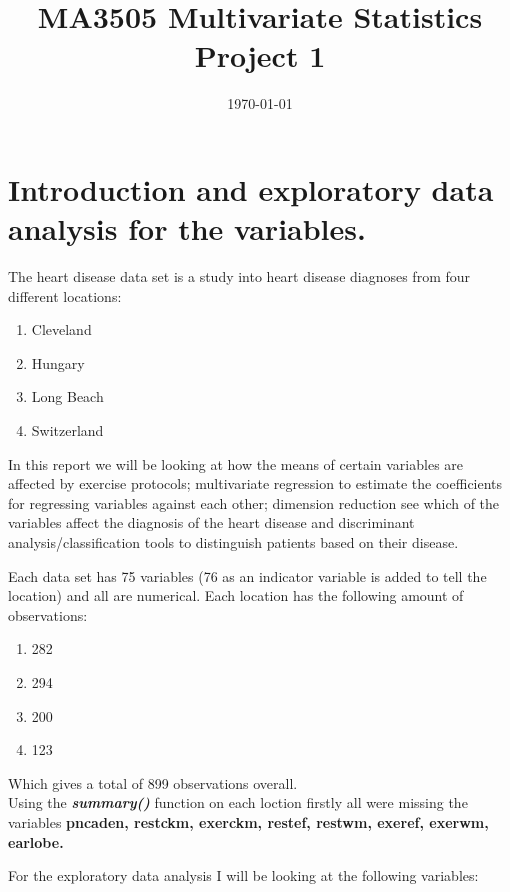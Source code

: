 \documentclass[a4paper]{article}
\title{MA3505 Multivariate Statistics Project 1}
\date{\today}
\begin{document}
\maketitle


\section{Introduction and exploratory data analysis for the variables.}
The heart disease data set is a study into heart disease diagnoses from four
different locations:
\begin{enumerate}
\item Cleveland
\item Hungary
\item Long Beach
\item Switzerland\\
\end{enumerate}

In this report we will be looking at how the means of certain variables are
affected by exercise protocols; multivariate regression to estimate the
coefficients for regressing variables against each other; dimension reduction
see which of the variables affect the diagnosis of the heart disease and
discriminant analysis/classification tools to distinguish patients based on
their disease.

Each data set has 75 variables (76 as an indicator variable is added to tell the
location) and all are numerical. Each location has the following amount of
observations:
\begin{enumerate}
\item 282
\item 294
\item 200
\item 123
\end{enumerate}
Which gives a total of 899 observations overall.\\
Using the \textbf{\textit{summary()}} function on each loction firstly all were
missing the variables \textbf{pncaden, restckm, exerckm, restef, restwm, exeref,
exerwm, earlobe.}

For the exploratory data analysis I will be looking at the following variables:
\newpage
\end{document}
